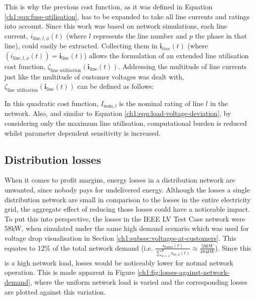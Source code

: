 This is why the previous cost function, as it was defined in Equation \ref{ch1:equ:fuse-utilisation}, has to be expanded to take all line currents and ratings into account.
Since this work was based on network simulations, each line current, $i_{\text{line},l,\phi}(t)$ (where $l$ represents the line number and $p$ the phase in that line), could easily be extracted.
Collecting them in $\textbf{i}_{line}(t)$ (where $(i_{\text{line},l,\phi}(t)) = \textbf{i}_\text{line}(t)$) allows the formulation of an extended line utilisation cost function, $\zeta_\text{line utilisation}(\textbf{i}_\text{line}(t))$.
Addressing the multitude of line currents just like the multitude of customer voltages was dealt with, $\zeta_\text{line utilisation}(\textbf{i}_\text{line}(t))$ can be defined as follows:



In this quadratic cost function, $I_{\text{nom},l}$ is the nominal rating of line $l$ in the network.
Also, and similar to Equation \ref{ch1:equ:load-voltage-deviation}, by considering only the maximum line utilisation, computational burden is reduced whilst parameter dependent sensitivity is increased.

\subsection{Distribution losses}
\label{ch1:subsec:losses}

When it comes to profit margins, energy losses in a distribution network are unwanted, since nobody pays for undelivered energy.
Although the losses a single distribution network are small in comparison to the losses in the entire electricity grid, the aggregate effect of reducing those losses could have a noticeable impact.
To put this into perspective, the losses in the IEEE LV Test Case network were 58kW, when simulated under the same high demand scenario which was used for voltage drop visualisation in Section \ref{ch1:subsec:voltages-at-customers}.
This equates to 12\% of the total network demand ($\text{i.e. }\frac{s_\text{losses}(t)}{\sum_{\phi=1}^\Phi{s_{\text{ss},\phi}(t)}} \approx \frac{58kW}{484kW}$).
Since this is a high network load, losses would be noticeably lower for notmal network operation.
This is made apparent in Figure \ref{ch1:fig:losses-against-network-demand}, where the uniform network load is varied and the corresponding losses are plotted against this variation.



